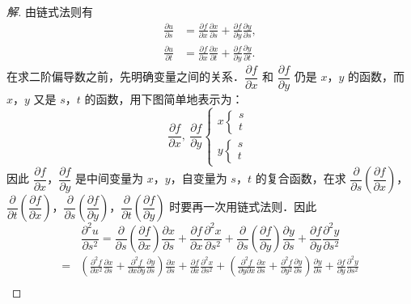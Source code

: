 \begin{proof}[解]
由链式法则有
\[
\begin{aligned}
\frac{\partial u}{\partial s}&=\frac{\partial f}{\partial x}\frac{\partial x}{\partial s}+\frac{\partial f}{\partial y}\frac{\partial y}{\partial s},\\
\frac{\partial u}{\partial t}&=\frac{\partial f}{\partial x}\frac{\partial x}{\partial t}+\frac{\partial f}{\partial y}\frac{\partial y}{\partial t}.
\end{aligned}
\]
在求二阶偏导数之前，先明确变量之间的关系．$\dfrac{\partial f}{\partial x}$ 和 $\dfrac{\partial f}{\partial y}$ 仍是 $x$，$y$ 的函数，而 $x$，$y$ 又是 $s$，$t$ 的函数，用下图简单地表示为：
\[
\frac{\partial f}{\partial x},\ \frac{\partial f}{\partial y}\left\{\begin{array}{l}x\left\{\begin{array}{l}s\\ t\end{array}\right.\\[4pt] y\left\{\begin{array}{l}s\\ t\end{array}\right.\end{array}\right.
\]
因此 $\dfrac{\partial f}{\partial x}$，$\dfrac{\partial f}{\partial y}$ 是中间变量为 $x$，$y$，自变量为 $s$，$t$ 的复合函数，在求 $\dfrac{\partial}{\partial s}\left(\dfrac{\partial f}{\partial x}\right)$，$\dfrac{\partial}{\partial t}\left(\dfrac{\partial f}{\partial x}\right)$，$\dfrac{\partial}{\partial s}\left(\dfrac{\partial f}{\partial y}\right)$，$\dfrac{\partial}{\partial t}\left(\dfrac{\partial f}{\partial y}\right)$ 时要再一次用链式法则．因此
\[
\frac{\partial^{2}u}{\partial s^{2}}=\frac{\partial}{\partial s}\left(\frac{\partial f}{\partial x}\right)\frac{\partial x}{\partial s}+\frac{\partial f}{\partial x}\frac{\partial^{2}x}{\partial s^{2}}+\frac{\partial}{\partial s}\left(\frac{\partial f}{\partial y}\right)\frac{\partial y}{\partial s}+\frac{\partial f}{\partial y}\frac{\partial^{2}y}{\partial s^{2}}
\]
\[
\begin{aligned}
={}&\left(\frac{\partial^{2}f}{\partial x^{2}}\frac{\partial x}{\partial s}+\frac{\partial^{2}f}{\partial x\partial y}\frac{\partial y}{\partial s}\right)\frac{\partial x}{\partial s}+\frac{\partial f}{\partial x}\frac{\partial^{2}x}{\partial s^{2}}+\left(\frac{\partial^{2}f}{\partial y\partial x}\frac{\partial x}{\partial s}+\frac{\partial^{2}f}{\partial y^{2}}\frac{\partial y}{\partial s}\right)\frac{\partial y}{\partial s}+\frac{\partial f}{\partial y}\frac{\partial^{2}y}{\partial s^{2}}\\

\end{aligned}\]
\end{proof}
